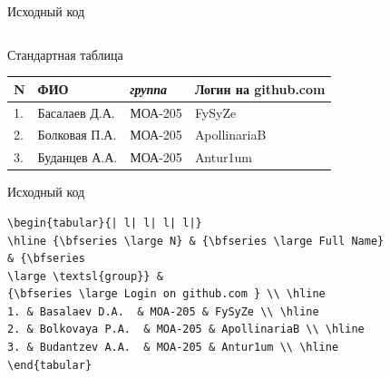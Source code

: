 \documentclass{beamer}[aspectratio=169]
\begin{document}
\begin{frame}[fragile]{Исходный код}
\begin{adjustbox}{scale=0.6}
\begin{large}
\begin{lstlisting}[language=Tex]
\end{lstlisting}
\end{large}
\end{adjustbox}
\end{frame}


\begin{frame}{Стандартная таблица}
\begin{tabular}{| l| l| l| l|}
\hline {\bfseries \large N} & {\bfseries \large ФИО} & {\bfseries \large \textsl{группа}} & {\bfseries \large Логин на github.com } \\ \hline
1. & Басалаев Д.А.  & МОА-205 & FySyZe \\ \hline
2. & Болковая П.А.  & МОА-205 & ApollinariaB \\ \hline
3. & Буданцев А.А.  & МОА-205 & Antur1um \\ \hline
\end{tabular}
\end{frame}

\begin{frame}[fragile]{Исходный код}
\begin{adjustbox}{scale=0.6}
\begin{large}
\transwipe

 \begin{lstlisting}[language=Tex]
  \begin{tabular}{| l| l| l| l|}
\hline {\bfseries \large N} & {\bfseries \large Full Name}
& {\bfseries 
\large \textsl{group}} & 
{\bfseries \large Login on github.com } \\ \hline
1. & Basalaev D.A.  & MOA-205 & FySyZe \\ \hline
2. & Bolkovaya P.A.  & MOA-205 & ApollinariaB \\ \hline
3. & Budantzev A.A.  & MOA-205 & Antur1um \\ \hline
\end{tabular}

\end{lstlisting}
\end{large}
\end{adjustbox}
\end{frame}
\end{document}
